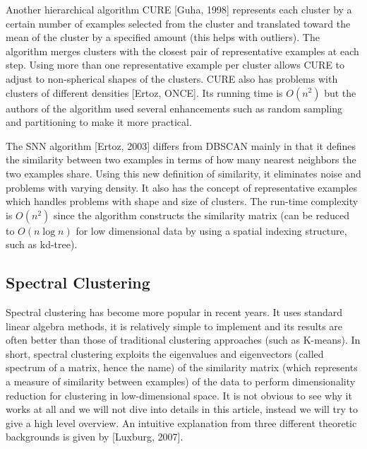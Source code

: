 \documentclass[conference]{IEEEtran}
\begin{document}
Another hierarchical algorithm CURE [Guha, 1998] represents each cluster by a certain
number of examples selected from the cluster and translated toward the mean of the cluster
by a specified amount (this helps with outliers). The algorithm merges clusters with
the closest pair of representative examples at each step. Using more than one representative
example per cluster allows CURE to adjust to non-spherical shapes of the clusters.
CURE also has problems with clusters of different densities [Ertoz, ONCE]. Its running
time is $O(n^2)$ but the authors of the algorithm used several enhancements such as
random sampling and partitioning to make it more practical.

The SNN algorithm [Ertoz, 2003] differs from DBSCAN mainly in that it defines the similarity
between two examples in terms of how many nearest neighbors the two examples share.
Using this new definition of similarity, it eliminates noise and problems with varying density.
It also has the concept of representative examples which handles problems with shape
and size of clusters. The run-time complexity is $O(n^2)$ since the algorithm constructs
the similarity matrix (can be reduced to $O(n \log n)$ for low dimensional data by using a spatial
indexing structure, such as kd-tree).


\subsection{Spectral Clustering}
Spectral clustering has become more popular in recent years. It uses standard linear algebra
methods, it is relatively simple to implement and its results are often better than those of
traditional clustering approaches (such as K-means). In short, spectral clustering exploits the
eigenvalues and eigenvectors (called spectrum of a matrix, hence the name) of the similarity matrix
(which represents
a measure of similarity between examples) of the data to perform dimensionality reduction for
clustering in low-dimensional space. It is not obvious to see why it works at all
and we will not dive into details in this article, instead we will try to give a high level overview.
An intuitive explanation from three different theoretic backgrounds is given by [Luxburg, 2007].
\end{document}
